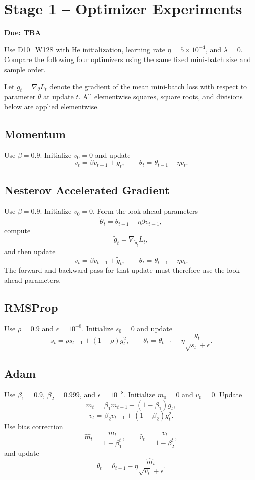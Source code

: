 \documentclass[11pt]{article}
\newcommand{\stageonedue}{TBA}
\begin{document}
\section{Stage 1 -- Optimizer Experiments}
\textbf{Due: \stageonedue}

Use D10\_W128 with He initialization, learning rate $\eta=5\times10^{-4}$, and $\lambda=0$. Compare the following four optimizers using the same fixed mini-batch size and sample order.

Let $g_t=\nabla_{\theta}L_t$ denote the gradient of the mean mini-batch loss with respect to parameter $\theta$ at update $t$. All elementwise squares, square roots, and divisions below are applied elementwise.

\subsection*{Momentum}
Use $\beta=0.9$. Initialize $v_0=0$ and update
\[
v_t = \beta v_{t-1}+g_t,
\qquad
\theta_t = \theta_{t-1}-\eta v_t.
\]

\subsection*{Nesterov Accelerated Gradient}
Use $\beta=0.9$. Initialize $v_0=0$. Form the look-ahead parameters
\[
\widetilde{\theta}_t=\theta_{t-1}-\eta\beta v_{t-1},
\]
compute
\[
\widetilde{g}_t=\nabla_{\widetilde{\theta}_t}L_t,
\]
and then update
\[
v_t=\beta v_{t-1}+\widetilde{g}_t,
\qquad
\theta_t=\theta_{t-1}-\eta v_t.
\]
The forward and backward pass for that update must therefore use the look-ahead parameters.

\subsection*{RMSProp}
Use $\rho=0.9$ and $\epsilon=10^{-8}$. Initialize $s_0=0$ and update
\[
s_t=\rho s_{t-1}+(1-\rho)g_t^2,
\qquad
\theta_t=\theta_{t-1}-\eta\frac{g_t}{\sqrt{s_t}+\epsilon}.
\]

\subsection*{Adam}
Use $\beta_1=0.9$, $\beta_2=0.999$, and $\epsilon=10^{-8}$. Initialize $m_0=0$ and $v_0=0$. Update
\[
m_t=\beta_1m_{t-1}+(1-\beta_1)g_t,
\]
\[
v_t=\beta_2v_{t-1}+(1-\beta_2)g_t^2.
\]
Use bias correction
\[
\widehat{m}_t=\frac{m_t}{1-\beta_1^t},
\qquad
\widehat{v}_t=\frac{v_t}{1-\beta_2^t},
\]
and update
\[
\theta_t=\theta_{t-1}-\eta\frac{\widehat{m}_t}{\sqrt{\widehat{v}_t}+\epsilon}.
\]
\end{document}
